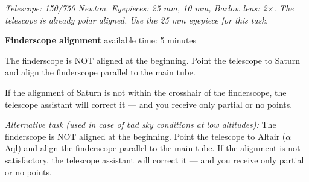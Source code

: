 \emph{Telescope: 150/750 Newton. Eyepieces: 25 mm, 10 mm, Barlow lens:
2$\times$. The telescope is already polar aligned. Use the 25 mm eyepiece
for this task.}

\textbf{Finderscope alignment} \hfill available time: 5 minutes

The finderscope is NOT aligned at the beginning. Point the telescope to
Saturn and align the finderscope parallel to the main tube.

If the alignment of Saturn is not within the crosshair of the finderscope,
the telescope assistant will correct it --- and you receive only partial or
no points.

\medskip
\emph{Alternative task (used in case of bad sky conditions at low
altitudes):} The finderscope is NOT aligned at the beginning. Point the
telescope to Altair ($\alpha$ Aql) and align the finderscope parallel to the
main tube. If the alignment is not satisfactory, the telescope assistant
will correct it --- and you receive only partial or no points.
